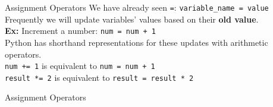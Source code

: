         \begin{frame}{Assignment Operators}
            \LARGE
            We have already seen \texttt{\textquotesingle=\textquotesingle}: 
            \pause
            \texttt{variable\_name = value}\\
            \pause
            Frequently we will update variables' values based on their \textbf{old value}.\\
            \pause
            \textbf{Ex:} Increment a number: \texttt{num = num + 1}\\
            \pause
            Python has shorthand representations for these updates with arithmetic operators.\\
            \pause
            \texttt{num += 1} is equivalent to \texttt{num = num + 1}\\
            \pause
            \texttt{result *= 2} is equivalent to \texttt{result = result * 2}\\
        \end{frame}

        \begin{frame}{Assignment Operators}
            \LARGE
			\begin{table}[]
			\end{table}
        \end{frame}

